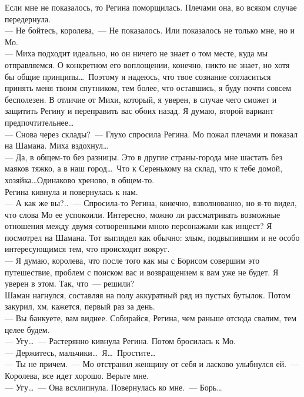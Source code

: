 Если мне не показалось, то Регина поморщилась. Плечами она, во всяком случае 
передернула. \\
--- Не бойтесь, королева,~--- Не показалось. Или показалось не только мне, но и 
Мо.\\ 
--- Миха подходит идеально, но он ничего не знает о том месте, куда мы 
отправляемся. О конкретном его воплощении, конечно, никто не знает, но хотя бы 
общие принципы\ldots\ Поэтому я надеюсь, что твое сознание согласиться принять 
меня твоим спутником, тем более, что оставшись, я буду почти совсем бесполезен. В 
отличие от Михи, который, я уверен, в случае чего сможет и защитить Регину и 
переправить вас обоих назад. Я думаю, второй вариант предпочтительнее\ldots\\
--- Снова через склады?~--- Глухо спросила Регина. Мо пожал плечами и показал на 
Шамана. Миха вздохнул\ldots\\
--- Да, в общем-то без разницы. Это в другие страны-города мне шастать без маяков 
тяжко, а в наш город\ldots\ Что к Серенькому на склад, что к тебе домой, 
хозяйка\ldots Одинаково хреново, в общем-то.\\
Регина кивнула и повернулась к нам.\\
--- А как же вы?..~--- Спросила-то Регина, конечно, взволнованно, но я-то видел, 
что слова Мо ее успокоили. Интересно, можно ли рассматривать возможные отношения 
между двумя сотворенными мною персонажами как инцест? Я посмотрел на Шамана. 
Тот выглядел как обычно: злым, подвыпившим и не особо интересующимся тем, что 
происходит вокруг.\\
--- Я думаю, королева, что после того как мы с Борисом совершим это путешествие, 
проблем с поиском вас и возвращением к вам уже не будет. Я уверен в этом. Так, 
что~--- решили?\\
Шаман нагнулся, составляя на полу аккуратный ряд из пустых бутылок. Потом 
закурил, хм, кажется, первый раз за день.\\
--- Вы банкуете, вам виднее. Собирайся, Регина, чем раньше отсюда свалим, тем 
целее будем.\\
--- Угу\ldots~--- Растерянно кивнула Регина. Потом бросилась к Мо.\\
--- Держитесь, мальчики\ldots\ Я\ldots\ Простите\ldots\\
--- Ты не причем.~--- Мо отстранил женщину от себя и ласково улыбнулся ей.~--- 
Королева, все идет хорошо. Верьте мне.\\
--- Угу\ldots~--- Она всхлипнула. Повернулась ко мне.~--- Борь\ldots\\
